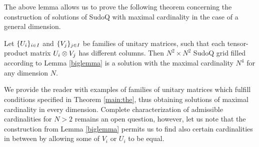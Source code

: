 \documentclass[aps,onecolumn,floatfix,superscriptaddress]{revtex4}
\begin{document}
The above lemma allows us to prove the following theorem concerning the construction of solutions of SudoQ with maximal cardinality in the case of a general dimension.
\begin{theorem}\label{main:the}
    Let $\{\mathnormal{U}_i\}_{i\in I}$ and  $\{\mathnormal{V}_j\}_{j\in I}$ be families of unitary matrices, such that each tensor-product matrix $\mathnormal{U}_i\otimes\mathnormal{V}_j$ has different columns. Then $N^2\times N^2$ SudoQ grid filled according to Lemma \ref{biglemma} is a solution with the maximal cardinality $N^{4}$ for any dimension $N$.
\end{theorem}

We provide the reader with examples of families of unitary matrices which fulfill conditions specified in Theorem \ref{main:the}, thus obtaining solutions of maximal cardinality in every dimension. Complete characterization of admissible cardinalities for $N>2$ remains an open question, however, let us note that the construction from Lemma \ref{biglemma} permits us to find also certain cardinalities in between by allowing some of $V_i$ or $U_i$ to be equal. 
\end{document}
